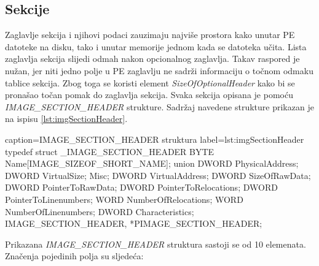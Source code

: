 \documentclass[times, utf8, diplomski, numeric]{fer}
\begin{document}
\subsection{Sekcije}
\label{sec:sekcije}

Zaglavlje sekcija i njihovi podaci zauzimaju najviše prostora
kako unutar PE datoteke na disku, tako i unutar memorije jednom
kada se datoteka učita. Lista zaglavlja sekcija slijedi odmah
nakon opcionalnog zaglavlja. Takav raspored je nužan, jer niti
jedno polje u PE zaglavlju ne sadrži informaciju o točnom odmaku
tablice sekcija. Zbog toga se koristi element
\emph{SizeOfOptionalHeader} kako bi se pronašao točan pomak do
zaglavlja sekcija. Svaka sekcija opisana je pomoću
\emph{IMAGE\_SECTION\_HEADER} strukture. Sadržaj navedene
strukture prikazan je na ispisu \ref{lst:imgSectionHeader}.				%

\begin{struktura} {caption=IMAGE\_SECTION\_HEADER struktura} {label=lst:imgSectionHeader}
typedef struct _IMAGE_SECTION_HEADER {
	BYTE    Name[IMAGE_SIZEOF_SHORT_NAME];
	union {
		DWORD   PhysicalAddress;
		DWORD   VirtualSize;
	} Misc;
	DWORD   VirtualAddress;
	DWORD   SizeOfRawData;
	DWORD   PointerToRawData;
	DWORD   PointerToRelocations;
	DWORD   PointerToLinenumbers;
	WORD    NumberOfRelocations;
	WORD    NumberOfLinenumbers;
	DWORD   Characteristics;
} IMAGE_SECTION_HEADER, *PIMAGE_SECTION_HEADER;
\end{struktura}

Prikazana \emph{IMAGE\_SECTION\_HEADER} struktura sastoji se od
10 elemenata. Značenja pojedinih polja su sljedeća:	
\end{document}
